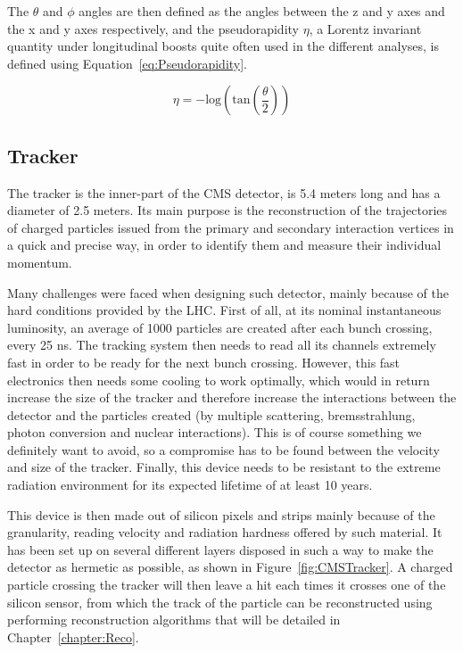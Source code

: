 \documentclass[a4paper, 10pt, openright]{report}
\begin{document}
The $\theta$ and $\phi$ angles are then defined as the angles between the z and y axes and the x and y axes respectively, and the pseudorapidity $\eta$, a Lorentz invariant quantity under longitudinal boosts quite often used in the different analyses, is defined using Equation~\ref{eq:Pseudorapidity}.

\begin{equation}
\label{eq:Pseudorapidity}
\eta = - \text{log} \left (\text{tan} \left (\frac{\theta}{2} \right ) \right )
\end{equation}

\subsection{Tracker} \label{subsection:Tracker}

The tracker is the inner-part of the \ac{CMS} detector, is 5.4 meters long and has a diameter of 2.5 meters. Its main purpose is the reconstruction of the trajectories of charged particles issued from the primary and secondary interaction vertices in a quick and precise way, in order to identify them and measure their individual momentum. 

Many challenges were faced when designing such detector, mainly because of the hard conditions provided by the \ac{LHC}. First of all, at its nominal instantaneous luminosity, an average of 1000 particles are created after each bunch crossing, every 25 ns. The tracking system then needs to read all its channels extremely fast in order to be ready for the next bunch crossing. However, this fast electronics then needs some cooling to work optimally, which would in return increase the size of the tracker and therefore increase the interactions between the detector and the particles created (by multiple scattering, bremsstrahlung, photon conversion and nuclear interactions). This is of course something we definitely want to avoid, so a compromise has to be found between the velocity and size of the tracker. Finally, this device needs to be resistant to the extreme radiation environment for its expected lifetime of at least 10 years.

This device is then made out of silicon pixels and strips mainly because of the granularity, reading velocity and radiation hardness offered by such material. It has been set up on several different layers disposed in such a way to make the detector as hermetic as possible, as shown in Figure~\ref{fig:CMSTracker}. A charged particle crossing the tracker will then leave a hit each times it crosses one of the silicon sensor, from which the track of the particle can be reconstructed using performing reconstruction algorithms that will be detailed in Chapter~\ref{chapter:Reco}.
\end{document}
